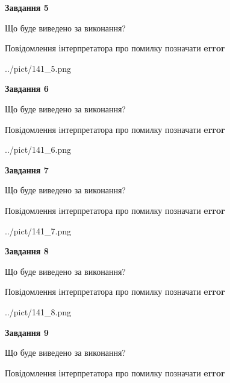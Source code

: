\documentclass[11pt, ukrainian]{article}
\begin{document}
{\begin {large}
{\begin {center}\textbf{Завдання 5}\end {center}}\par
Що буде виведено за виконання? \par
Повідомлення інтерпретатора про помилку позначати \textbf{error}

\begin{center}
	{../pict/141_5.png}
\end{center}
\newpage

{\begin {center}\textbf{Завдання 6}\end {center}}\par
Що буде виведено за виконання? \par
Повідомлення інтерпретатора про помилку позначати \textbf{error}

\begin{center}
	{../pict/141_6.png}
\end{center}
\newpage

{\begin {center}\textbf{Завдання 7}\end {center}}\par
Що буде виведено за виконання? \par
Повідомлення інтерпретатора про помилку позначати \textbf{error}

\begin{center}
	{../pict/141_7.png}
\end{center}
\newpage

{\begin {center}\textbf{Завдання 8}\end {center}}\par
Що буде виведено за виконання? \par
Повідомлення інтерпретатора про помилку позначати \textbf{error}

\begin{center}
	{../pict/141_8.png}
\end{center}
\newpage

{\begin {center}\textbf{Завдання 9}\end {center}}\par
Що буде виведено за виконання? \par
Повідомлення інтерпретатора про помилку позначати \textbf{error}


\end{large}}
\end{document}
